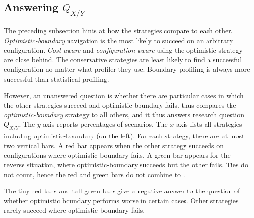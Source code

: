 \subsection{Answering $Q_{X/Y}$} \label{subsec:hh} \label{s:hh}

The preceding subsection hints at how the strategies compare to each other.
\emph{Optimistic-boundary} navigation is the most likely to succeed on an
arbitrary configuration.  \emph{Cost-aware} and \emph{configuration-aware} using
the optimistic strategy are close behind.  The conservative strategies are least
likely to find a successful configuration no matter what profiler they use.
Boundary profiling is always more successful than statistical profiling.

However,
an unanswered question is whether there are particular cases in which the other
strategies succeed and optimistic-boundary fails.
 thus compares the \emph{optimistic-boundary} strategy to all
others, and it thus answers research question $Q_{X/Y}$.  The $y$-axis reports
percentages of scenarios.  The $x$-axis lists all strategies including
optimistic-boundary (on the left).  For each strategy, there are at most two
vertical bars.  A red bar appears when the other strategy succeeds on
configurations where optimistic-boundary fails.  A green bar appears for the
reverse situation, where optimistic-boundary succeeds but the other fails.  Ties
do not count,  hence the red and green bars do not combine to .

The tiny red bars and tall green bars give a negative answer to
the question of whether optimistic boundary performs worse in
certain cases.
Other strategies rarely succeed where optimistic-boundary fails.

